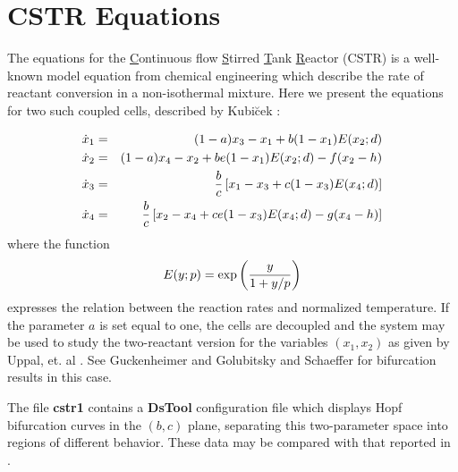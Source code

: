 \section{CSTR Equations}
The equations for the \underline{C}ontinuous flow \underline{S}tirred
\underline{T}ank \underline{R}eactor (CSTR) is a well-known model equation 
from chemical engineering which describe the rate of reactant
conversion in a non-isothermal mixture.  Here we present the equations
for two such coupled cells, described by Kubi\u{c}ek \cite{kubicek1}:

\begin{eqnarray*}
   \dot{x}_1 & = & (1-a) x_3 - x_1 + b(1-x_1) E(x_2; d) \\
   \dot{x}_2 & = & (1-a) x_4 - x_2 + b e (1-x_1) E(x_2;d) - f(x_2-h) \\
   \dot{x}_3 & = & \frac{\normalsize \mbox{$b$}}{\normalsize \mbox{$c$}} \left [
		   x_1 - x_3 + c(1-x_3) E(x_4;d) \right ] \\
   \dot{x}_4 & = & \frac{\normalsize \mbox{$b$}}{\normalsize \mbox{$c$}} \left [
		   x_2 - x_4 + ce(1-x_3) E(x_4;d) - g (x_4-h) \right ] \\
\end{eqnarray*}
where the function
\[
         E(y;p) = \exp\left (  { {\normalsize \mbox{$y$}} \over 
				 {\normalsize \mbox{$1 + y/p$}} }\right )
\]
expresses the relation between the reaction rates and normalized
temperature.  If the parameter $a$ is set equal to one, the cells are
decoupled and the system may be used to study the two-reactant version
for the variables $(x_1,x_2)$ as given by Uppal, et. al \cite{uppal1}.
See Guckenheimer \cite{gucken1} and Golubitsky and Schaeffer \cite[pp.
16-25]{golubitsky3} for bifurcation results in this case.
\medskip

\noindent The file {\bf cstr1} contains a {\bf DsTool} configuration file which
displays Hopf bifurcation curves in
the $(b,c)$ plane, separating this two-parameter space into regions of
different behavior.  These data may be compared with that reported in 
\cite{kubicek1}.

